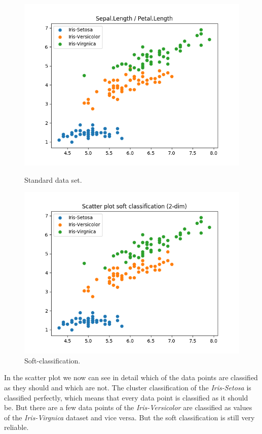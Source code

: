 \documentclass[a4paper]{article}
\begin{document}
\begin{enumerate}
\begin{figure}[htp]
\begin{minipage}{0.4\textwidth}
	\centering
  \includegraphics[scale=0.6]{plots/basic_scenario1_cmpnt3.png}
  \caption{Standard data set.}
\end{minipage}
\hfill
\begin{minipage}{0.4\textwidth}
	\centering
  \includegraphics[scale=0.6]{plots/soft_scatter_scenario1_cmpnt3.png}
  \caption{Soft-classification.}
\end{minipage}
\end{figure}

In the scatter plot we now can see in detail which of the data points are classified as they should and which are not. The cluster classification of the \textit{Iris-Setosa} is classified perfectly, which means that every data point is classified as it should be.
But there are a few data points of the \textit{Iris-Versicolor} are classified as values of the \textit{Iris-Virgnica} dataset and vice versa. But the soft classification is still very reliable.


\end{enumerate}
\end{document}
